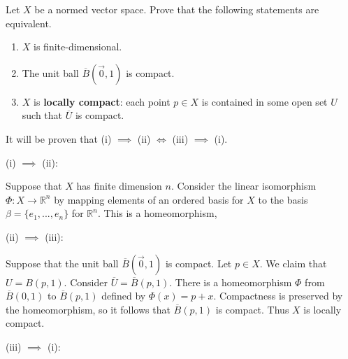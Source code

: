 \documentclass{article}
\newcommand{\cl}[1]{\overline{#1}}
\theoremstyle{plain} %
\numberwithin{thm}{section} %
\theoremstyle{definition}
\begin{document}
    \begin{question}{24}
        Let $X$ be a normed vector space. Prove that the following statements are equivalent.
        \begin{enumerate}[label=(\roman*)]
            \item $X$ is finite-dimensional.
            \item The unit ball $\cl{B}(\vec{0},1)$ is compact.
            \item $X$ is \textbf{locally compact}: each point $p\in X$ is contained in some open set $U$ such that $\cl{U}$ is compact.
        \end{enumerate}
        \tcblower
        It will be proven that (i) \(\implies\) (ii) \(\iff\) (iii) \(\implies\) (i).

        (i) \(\implies\)  (ii):

        Suppose that \(X\) has finite dimension \(n\). Consider the linear isomorphism \(\Phi : X \to \mathbb{R}^n\) by mapping elements of an ordered basis for \(X\) to the basis \(\beta = \{e_1, ..., e_n\}\) for \(\mathbb{R}^n\). This is a homeomorphism, 

        (ii) \(\implies\) (iii):

        Suppose that the unit ball \(\cl{B}(\vec{0}, 1)\) is compact. Let \(p \in X\). We claim that \(U = B(p,1)\). Consider \(\cl{U} = \cl{B}(p,1)\). There is a homeomorphism \(\Phi\) from \(\cl{B}(0,1)\) to \(\cl{B}(p,1)\) defined by \(\Phi (x) = p + x\). Compactness is preserved by the homeomorphism, so it follows that \(\cl{B}(p,1)\) is compact. Thus \(X\) is locally compact.

        (iii) \(\implies\) (i):
    \end{question}
    
\end{document}
